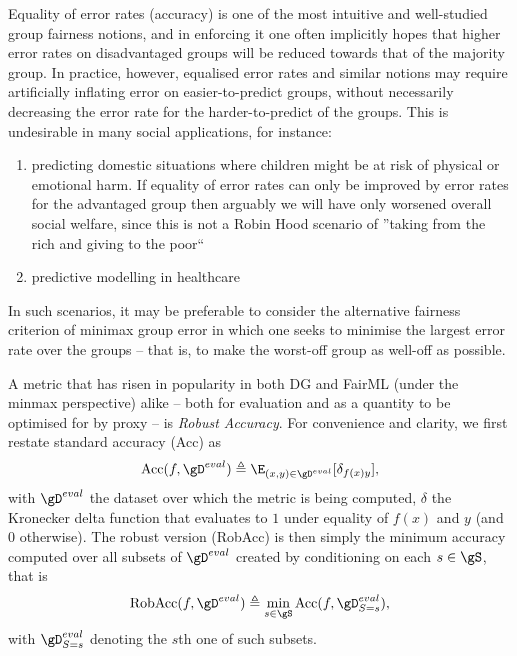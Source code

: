 Equality of error rates (accuracy) is one of the most intuitive and well-studied group fairness
notions, and in enforcing it one often implicitly hopes that higher error rates on disadvantaged
groups will be reduced towards that of the majority group.
In practice, however, equalised error rates and similar notions may require artificially inflating
error on easier-to-predict groups, without necessarily decreasing the error rate for the
harder-to-predict of the groups. 
%
This is undesirable in many social applications, for instance:
\begin{enumerate}
        \item predicting domestic situations where children might be at risk of physical or
            emotional harm. If equality of error rates can only be improved by error rates for the
            advantaged group then arguably we will have only worsened overall social welfare, since
            this is not a Robin Hood scenario of ''taking from the rich and giving to the poor``
        \item predictive modelling in healthcare
\end{enumerate}

In such scenarios, it may be preferable to consider the alternative fairness criterion of minimax
group error in which one seeks to minimise the largest error rate over the groups -- that is, to
make the worst-off group as well-off as possible.

%
A metric that has risen in popularity in both DG and FairML (under the minmax perspective) alike --
both for evaluation and as a quantity to be optimised for by proxy -- is \emph{Robust Accuracy}.
%
For convenience and clarity, we first restate standard accuracy (Acc) as 
%
\begin{equation}
    \text{Acc}(f, \gD^{eval}) \triangleq 
    \E_{ (x, y) \in \gD^{eval}}[ \delta_{f(x)y} ],
 \end{equation}
%
with \( \gD^{eval} \) the dataset over which the metric is being computed, \( \delta \) the
Kronecker delta function that evaluates to \(1\) under equality of \(f(x)\) and \(y\) (and \(0\)
otherwise).
%
The robust version (RobAcc) is then simply the minimum accuracy computed over all subsets of \(
\gD^{eval} \) created by conditioning on each \(s \in \gS \), that is
%
\begin{equation}
    \text{RobAcc}(f, \gD^{eval}) \triangleq 
    \underset{s \in \gS}{\text{min}} \, \text{Acc}(f, \gD^{eval}_{S=s}),
 \end{equation}
%
 with \( \gD^{eval}_{S=s} \) denoting the \(s\)th one of such subsets.


